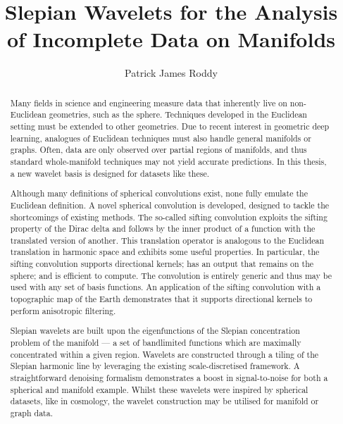 
\title{Slepian Wavelets for the Analysis of Incomplete Data on Manifolds}
\author{Patrick James Roddy}

\maketitle
\makedeclaration{}

\begin{abstract} %
	Many fields in science and engineering measure data that inherently live on non-Euclidean geometries, such as the sphere.
	Techniques developed in the Euclidean setting must be extended to other geometries.
	Due to recent interest in geometric deep learning, analogues of Euclidean techniques must also handle general manifolds or graphs.
	Often, data are only observed over partial regions of manifolds, and thus standard whole-manifold techniques may not yield accurate predictions.
	In this thesis, a new wavelet basis is designed for datasets like these.

	Although many definitions of spherical convolutions exist, none fully emulate the Euclidean definition.
	A novel spherical convolution is developed, designed to tackle the shortcomings of existing methods.
	The so-called sifting convolution exploits the sifting property of the Dirac delta and follows by the inner product of a function with the translated version of another.
	This translation operator is analogous to the Euclidean translation in harmonic space and exhibits some useful properties.
	In particular, the sifting convolution supports directional kernels; has an output that remains on the sphere; and is efficient to compute.
	The convolution is entirely generic and thus may be used with any set of basis functions.
	An application of the sifting convolution with a topographic map of the Earth demonstrates that it supports directional kernels to perform anisotropic filtering.

	Slepian wavelets are built upon the eigenfunctions of the Slepian concentration problem of the manifold --- a set of bandlimited functions which are maximally concentrated within a given region.
	Wavelets are constructed through a tiling of the Slepian harmonic line by leveraging the existing scale-discretised framework.
	A straightforward denoising formalism demonstrates a boost in signal-to-noise for both a spherical and manifold example.
	Whilst these wavelets were inspired by spherical datasets, like in cosmology, the wavelet construction may be utilised for manifold or graph data.
\end{abstract}

